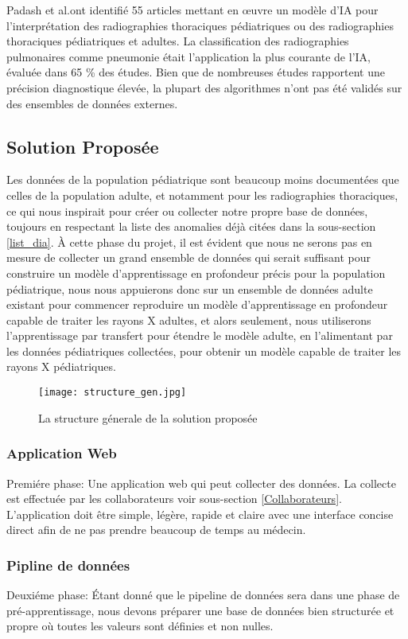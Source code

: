                 Padash et al.ont identifié 55 articles mettant en œuvre un modèle d'IA pour l'interprétation des radiographies thoraciques pédiatriques ou des radiographies thoraciques pédiatriques et adultes. La classification des radiographies pulmonaires comme pneumonie était l'application la plus courante de l'IA, évaluée dans 65 \% des études. Bien que de nombreuses études rapportent une précision diagnostique élevée, la plupart des algorithmes n'ont pas été validés sur des ensembles de données externes.

        \subsection{Solution Proposée}\label{Solution_prop}
        Les données de la population pédiatrique sont beaucoup moins documentées que celles de la population adulte, et notamment pour les radiographies thoraciques, ce qui nous inspirait pour créer ou collecter notre propre base de données, toujours en respectant la liste des anomalies déjà citées dans la sous-section  \ref{list_dia}.
        À cette phase du projet, il est évident que nous ne serons pas en mesure de collecter un grand ensemble de données qui serait suffisant pour construire un modèle d'apprentissage en profondeur précis pour la population pédiatrique, nous nous appuierons donc sur un ensemble de données adulte existant pour commencer reproduire un modèle d'apprentissage en profondeur capable de traiter les rayons X adultes, et alors seulement, nous utiliserons l'apprentissage par transfert pour étendre le modèle adulte, en l'alimentant par les données pédiatriques collectées, pour obtenir un modèle capable de traiter les rayons X pédiatriques.
        \begin{figure}[H]
            \centering
            \texttt{[image: structure\_gen.jpg]}
            \caption{La structure génerale de la solution proposée}\label{fig:sol_prop_01}
        \end{figure}
            \subsubsection*{Application Web}
                Premiére phase:
                Une application web qui peut collecter des données. La collecte est effectuée par les collaborateurs voir sous-section \ref{Collaborateurs}. L'application doit être simple, légère, rapide et claire avec une interface concise direct afin de ne pas prendre beaucoup de temps au médecin.
            \subsubsection*{Pipline de données}
                Deuxiéme phase:
                Étant donné que le pipeline de données sera dans une phase de pré-apprentissage, nous devons préparer une base de données bien structurée et propre où toutes les valeurs sont définies et non nulles.

